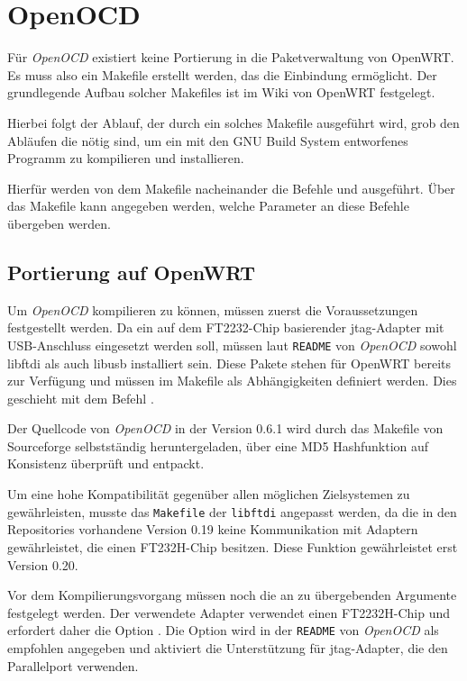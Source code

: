 \section{OpenOCD}
Für \emph{OpenOCD} existiert keine Portierung in die Paketverwaltung von OpenWRT. Es
muss also ein Makefile erstellt werden, das die Einbindung ermöglicht. Der
grundlegende Aufbau solcher Makefiles ist im Wiki von OpenWRT
festgelegt\cite{OWRT}.

Hierbei folgt der Ablauf, der durch ein solches Makefile ausgeführt wird,
grob den Abläufen die nötig sind, um ein mit den GNU Build System entworfenes
Programm zu kompilieren und installieren.

Hierfür werden von dem Makefile nacheinander die Befehle 
und  ausgeführt. Über das Makefile kann angegeben werden, welche
Parameter an diese Befehle übergeben werden.
\subsection{Portierung auf OpenWRT}
Um \emph{OpenOCD} kompilieren zu können, müssen zuerst die Voraussetzungen festgestellt
werden. Da ein auf dem FT2232-Chip basierender \gls{jtag}-Adapter mit
USB-Anschluss eingesetzt werden soll, müssen laut \texttt{README} von \emph{OpenOCD}
sowohl libftdi als auch libusb installiert sein. Diese Pakete stehen für OpenWRT
bereits zur Verfügung und müssen im Makefile als Abhängigkeiten definiert
werden. Dies geschieht mit dem Befehl .

Der Quellcode von \emph{OpenOCD} in der Version 0.6.1 wird durch das Makefile von
Sourceforge selbstständig heruntergeladen, über eine MD5 Hashfunktion auf
Konsistenz überprüft und entpackt.

Um eine hohe Kompatibilität gegenüber allen möglichen Zielsystemen zu
gewährleisten, musste das \texttt{Makefile} der \texttt{libftdi} angepasst werden, da die in den
Repositories \nopagebreak vorhandene Version 0.19  keine Kommunikation mit
Adaptern gewährleistet, die einen FT232H-Chip besitzen. Diese Funktion gewährleistet erst
Version 0.20.

Vor dem Kompilierungsvorgang müssen noch die an 
zu übergebenden Argumente festgelegt werden. Der verwendete Adapter
verwendet einen FT2232H-Chip und erfordert daher die Option
.
Die Option  wird in der \texttt{README} von \emph{OpenOCD} als
empfohlen angegeben und aktiviert die Unterstützung für \gls{jtag}-Adapter, die
den Parallelport verwenden.

